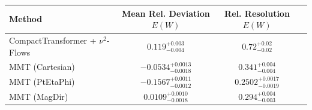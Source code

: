    \begin{tabular}{lccc}
        \toprule
        Method & Mean Rel. Deviation $E(W)$ & Rel. Resolution $E(W)$ \\
        \midrule
        CompactTransformer + $\nu^2$-Flows & $0.119^{+0.003}_{-0.004}$ & $0.72^{+0.02}_{-0.02}$ \\
        MMT (Cartesian) & $-0.0534^{+0.0013}_{-0.0018}$ & $0.341^{+0.004}_{-0.004}$ \\
        MMT (PtEtaPhi) & $-0.1567^{+0.0011}_{-0.0012}$ & $0.2502^{+0.0017}_{-0.0019}$ \\
        MMT (MagDir) & $0.0109^{+0.0010}_{-0.0018}$ & $0.294^{+0.004}_{-0.003}$ \\
        \bottomrule
    \end{tabular}